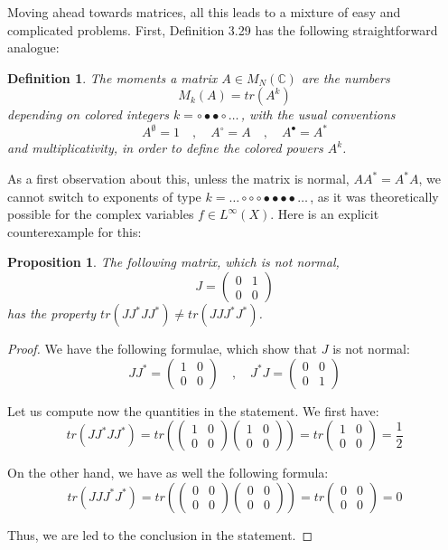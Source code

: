 \documentclass[12pt]{amsbook}
\newtheorem{definition}[theorem]{Definition}
\newtheorem{proposition}[theorem]{Proposition}
\begin{document}
Moving ahead towards matrices, all this leads to a mixture of easy and complicated problems. First, Definition 3.29 has the following straightforward analogue:


\begin{definition}
The moments a matrix $A\in M_N(\mathbb C)$ are the numbers
$$M_k(A)=tr(A^k)$$
depending on colored integers $k=\circ\bullet\bullet\circ\ldots\,$, with the usual conventions
$$A^\emptyset=1\quad,\quad A^\circ=A\quad,\quad A^\bullet=A^*$$
and multiplicativity, in order to define the colored powers $A^k$.
\end{definition}

As a first observation about this, unless the matrix is normal, $AA^*=A^*A$, we cannot switch to exponents of type $k=\ldots\circ\circ\circ\bullet\bullet\bullet\bullet\ldots\,$, as it was theoretically possible for the complex variables $f\in L^\infty(X)$. Here is an explicit counterexample for this:

\begin{proposition}
The following matrix, which is not normal,
$$J=\begin{pmatrix}0&1\\0&0\end{pmatrix}$$
has the property $tr(JJ^*JJ^*)\neq tr(JJJ^*J^*)$.
\end{proposition}

\begin{proof}
We have the following formulae, which show that $J$ is not normal:
$$JJ^*=\begin{pmatrix}1&0\\0&0\end{pmatrix}\quad,\quad 
J^*J=\begin{pmatrix}0&0\\0&1\end{pmatrix}$$

Let us compute now the quantities in the statement. We first have:
$$tr(JJ^*JJ^*)
=tr\left(\begin{pmatrix}1&0\\0&0\end{pmatrix}\begin{pmatrix}1&0\\0&0\end{pmatrix}\right)
=tr\begin{pmatrix}1&0\\0&0\end{pmatrix}
=\frac{1}{2}$$

On the other hand, we have as well the following formula:
$$tr(JJJ^*J^*)
=tr\left(\begin{pmatrix}0&0\\0&0\end{pmatrix}
\begin{pmatrix}0&0\\0&0\end{pmatrix}
\right)
=tr\begin{pmatrix}0&0\\0&0\end{pmatrix}
=0$$

Thus, we are led to the conclusion in the statement.
\end{proof}
\end{document}
